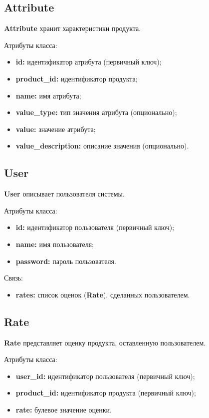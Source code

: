 \subsection{Attribute}

\textbf{Attribute} хранит характеристики продукта.

Атрибуты класса:
\begin{itemize}
	\item \textbf{id:} идентификатор атрибута (первичный ключ);
	\item \textbf{product\_id:} идентификатор продукта;
	\item \textbf{name:} имя атрибута;
	\item \textbf{value\_type:} тип значения атрибута (опционально);
	\item \textbf{value:} значение атрибута;
	\item \textbf{value\_description:} описание значения (опционально).
\end{itemize}

\subsection{User}

\textbf{User} описывает пользователя системы.

Атрибуты класса:
\begin{itemize}
	\item \textbf{id:} идентификатор пользователя (первичный ключ);
	\item \textbf{name:} имя пользователя;
	\item \textbf{password:} пароль пользователя.
\end{itemize}

Связь:
\begin{itemize}
	\item \textbf{rates:} список оценок (\textbf{Rate}), сделанных пользователем.
\end{itemize}

\subsection{Rate}

\textbf{Rate} представляет оценку продукта, оставленную пользователем.

Атрибуты класса:
\begin{itemize}
	\item \textbf{user\_id:} идентификатор пользователя (первичный ключ);
	\item \textbf{product\_id:} идентификатор продукта (первичный ключ);
	\item \textbf{rate:} булевое значение оценки.
\end{itemize}

